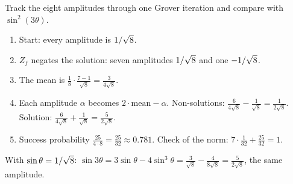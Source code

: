 \begin{exercisebox}
\begin{pproblem}[Inversion about the mean for $N = 8$, $a = 1$]\label{wp:mean8}
    Track the eight amplitudes through one Grover iteration and compare with
    $\sin^2(3\theta)$.
\end{pproblem}
\tcblower
\begin{wsolution}
    \leavevmode
    \begin{enumerate}
        \item Start: every amplitude is $1/\sqrt{8}$.
        \item $Z_f$ negates the solution: seven amplitudes $1/\sqrt{8}$ and one
              $-1/\sqrt{8}$.
        \item The mean is $\frac{1}{8} \cdot \frac{7 - 1}{\sqrt{8}} = \frac{3}{4\sqrt{8}}$.
        \item Each amplitude $\alpha$ becomes $2 \cdot \text{mean} - \alpha$. Non-solutions:
              $\frac{6}{4\sqrt{8}} - \frac{1}{\sqrt{8}} = \frac{1}{2\sqrt{8}}$. Solution:
              $\frac{6}{4\sqrt{8}} + \frac{1}{\sqrt{8}} = \frac{5}{2\sqrt{8}}$.
        \item Success probability $\frac{25}{4 \cdot 8} = \frac{25}{32} \approx 0.781$. Check of the
              norm: $7 \cdot \frac{1}{32} + \frac{25}{32} = 1$.
    \end{enumerate}
    With $\sin\theta = 1/\sqrt{8}$: $\sin 3\theta = 3\sin\theta - 4\sin^3\theta =
    \frac{3}{\sqrt{8}} - \frac{4}{8\sqrt{8}} = \frac{5}{2\sqrt{8}}$, the same amplitude.
\end{wsolution}
\end{exercisebox}

